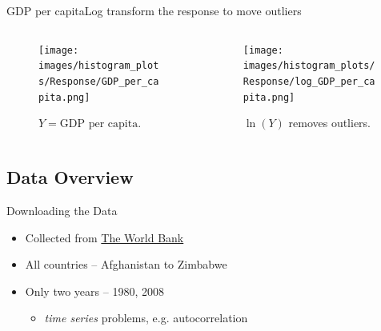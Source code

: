 \documentclass{beamer}
\begin{document}
\begin{frame}{GDP per capita}{Log transform the response to move outliers}
  \begin{columns}
    \begin{column}{0.5\textwidth}
      \begin{figure}
        \texttt{[image: images/histogram\_plots/Response/GDP\_per\_capita.png]}
        \caption{$Y = \textrm{GDP per capita}$.}
      \end{figure}
    \end{column}
    
    \begin{column}{0.5\textwidth}
      \begin{figure}
        \texttt{[image: images/histogram\_plots/Response/log\_GDP\_per\_capita.png]}
        \caption{$\ln(Y)$ removes outliers.}
      \end{figure}
    \end{column}
  \end{columns}
\end{frame}


\subsection{Data Overview}
\begin{frame}{Downloading the Data}
  \begin{itemize}
  \item Collected from \href{http://data.worldbank.org/indicator}{The World Bank} 
  \item All countries -- Afghanistan to Zimbabwe
  \item Only two years -- 1980, 2008
    \begin{itemize}
    \item \emph{time series} problems, e.g. autocorrelation
    \end{itemize}
  \end{itemize}
\end{frame}
\end{document}
